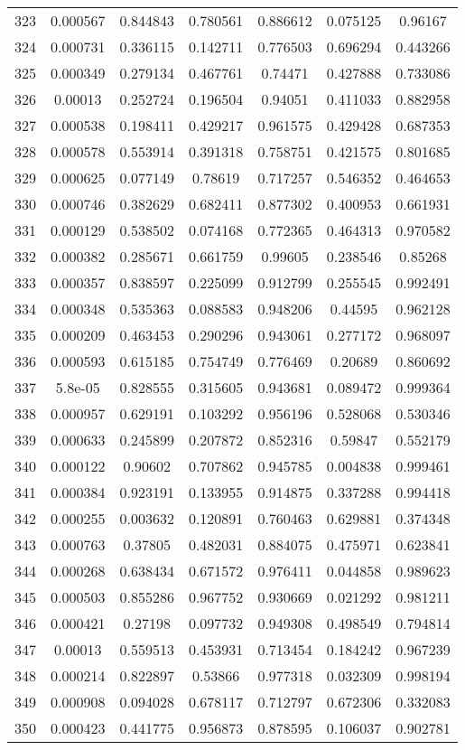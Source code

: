 \begin{table}
\begin{tabular}{c|c|c|c|c|c|c}
323 & 0.000567 & 0.844843 & 0.780561 & 0.886612 & 0.075125 & 0.96167\\
324 & 0.000731 & 0.336115 & 0.142711 & 0.776503 & 0.696294 & 0.443266\\
325 & 0.000349 & 0.279134 & 0.467761 & 0.74471 & 0.427888 & 0.733086\\
326 & 0.00013 & 0.252724 & 0.196504 & 0.94051 & 0.411033 & 0.882958\\
327 & 0.000538 & 0.198411 & 0.429217 & 0.961575 & 0.429428 & 0.687353\\
328 & 0.000578 & 0.553914 & 0.391318 & 0.758751 & 0.421575 & 0.801685\\
329 & 0.000625 & 0.077149 & 0.78619 & 0.717257 & 0.546352 & 0.464653\\
330 & 0.000746 & 0.382629 & 0.682411 & 0.877302 & 0.400953 & 0.661931\\
331 & 0.000129 & 0.538502 & 0.074168 & 0.772365 & 0.464313 & 0.970582\\
332 & 0.000382 & 0.285671 & 0.661759 & 0.99605 & 0.238546 & 0.85268\\
333 & 0.000357 & 0.838597 & 0.225099 & 0.912799 & 0.255545 & 0.992491\\
334 & 0.000348 & 0.535363 & 0.088583 & 0.948206 & 0.44595 & 0.962128\\
335 & 0.000209 & 0.463453 & 0.290296 & 0.943061 & 0.277172 & 0.968097\\
336 & 0.000593 & 0.615185 & 0.754749 & 0.776469 & 0.20689 & 0.860692\\
337 & 5.8e-05 & 0.828555 & 0.315605 & 0.943681 & 0.089472 & 0.999364\\
338 & 0.000957 & 0.629191 & 0.103292 & 0.956196 & 0.528068 & 0.530346\\
339 & 0.000633 & 0.245899 & 0.207872 & 0.852316 & 0.59847 & 0.552179\\
340 & 0.000122 & 0.90602 & 0.707862 & 0.945785 & 0.004838 & 0.999461\\
341 & 0.000384 & 0.923191 & 0.133955 & 0.914875 & 0.337288 & 0.994418\\
342 & 0.000255 & 0.003632 & 0.120891 & 0.760463 & 0.629881 & 0.374348\\
343 & 0.000763 & 0.37805 & 0.482031 & 0.884075 & 0.475971 & 0.623841\\
344 & 0.000268 & 0.638434 & 0.671572 & 0.976411 & 0.044858 & 0.989623\\
345 & 0.000503 & 0.855286 & 0.967752 & 0.930669 & 0.021292 & 0.981211\\
346 & 0.000421 & 0.27198 & 0.097732 & 0.949308 & 0.498549 & 0.794814\\
347 & 0.00013 & 0.559513 & 0.453931 & 0.713454 & 0.184242 & 0.967239\\
348 & 0.000214 & 0.822897 & 0.53866 & 0.977318 & 0.032309 & 0.998194\\
349 & 0.000908 & 0.094028 & 0.678117 & 0.712797 & 0.672306 & 0.332083\\
350 & 0.000423 & 0.441775 & 0.956873 & 0.878595 & 0.106037 & 0.902781\\
\end{tabular}
\end{table}
